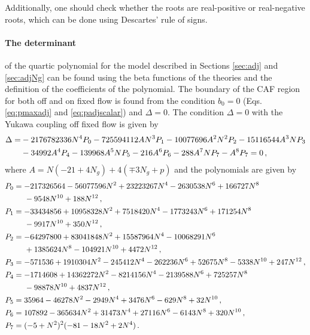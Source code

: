 Additionally, one should check whether the roots are real-positive or real-negative roots, which can be done using Descartes' rule of signs.

\paragraph{The determinant}of the quartic polynomial for the model described in Sections \ref{sec:adj} and \ref{sec:adjNg} can be found using the beta functions of the theories and the definition of the coefficients of the polynomial. The boundary of the CAF region for both off and on fixed flow is found from the condition $b_0=0$ (Eqs. \eqref{eq:pmaxadj} and \eqref{eq:padjscalar}) and $\Delta=0$. The condition $\Delta=0$ with the Yukawa coupling off fixed flow is given by
\begin{align}
 \Delta=&-2176782336 N^4 P_0 - 725594112 A N^3 P_1 - 10077696 A^2 N^2 P_2 - 15116544 A^3 N P_3  \notag \\
&- 34992 A^4 P_4 - 139968 A^5 N P_5- 216 A^6 P_6 - 288 A^7 N P_7 - A^8 P_7  = 0\,,\label{eq:Delta0noY}
\end{align}
where $A = N (-21 + 4 N_g) + 4 (\mp3 N_g + p)$ and the polynomials are given by
\begin{align}
P_0 &= -217326564 - 56077596 N^2 + 23223267 N^4 - 2630538 N^6 + 166727 N^8 \notag\\&\;\;\;\;\; - 9548 N^{10} + 188 N^{12}\,, \\
P_1 &= -33434856 + 10958328 N^2 + 7518420 N^4 - 1773243 N^6 + 171254 N^8 \notag\\&\;\;\;\;\;- 9917 N^{10} + 350 N^{12}\,, \\
P_2 &= -64297800 + 83041848 N^2 + 15587964 N^4 - 10068291 N^6 \notag\\&\;\;\;\;\;+ 1385624 N^8 - 104921 N^{10} + 4472 N^{12} \,,\\
P_3 &= -571536 + 1910304 N^2 - 245412 N^4 - 262236 N^6 + 52675 N^8 - 5338 N^{10} + 247 N^{12}\,, \\
P_4 &= -1714608 + 14362272 N^2 - 8214156 N^4 - 2139588 N^6 + 725257 N^8 \notag\\&\;\;\;\;\;- 98878 N^{10} + 4837 N^{12} \,,\\
P_5 &= 35964 - 46278 N^2 - 2949 N^4 + 3476 N^6 - 629 N^8 + 32 N^{10}\,, \\
P_6 &= 107892 - 365634 N^2 + 31473 N^4 + 27116 N^6 - 6143 N^8 + 320 N^{10}\,, \\
P_7 &= (-5 + N^2)^2 (-81 - 18 N^2 + 2 N^4)\,.
\end{align}
